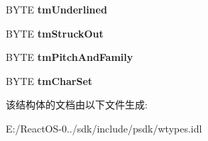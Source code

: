 \begin{DoxyCompactItemize}
B\+Y\+TE {\bfseries tm\+Underlined}
\item 
\mbox{\label{struct_i_win_types_1_1tag_t_e_x_t_m_e_t_r_i_c_a_ac6046de1eee37d3e350f988397a76fb9}} 
B\+Y\+TE {\bfseries tm\+Struck\+Out}
\item 
\mbox{\label{struct_i_win_types_1_1tag_t_e_x_t_m_e_t_r_i_c_a_a7fb69d622efd4197064c012ad96b3761}} 
B\+Y\+TE {\bfseries tm\+Pitch\+And\+Family}
\item 
\mbox{\label{struct_i_win_types_1_1tag_t_e_x_t_m_e_t_r_i_c_a_af76b8cb20ac116959aa181f499cebcc7}} 
B\+Y\+TE {\bfseries tm\+Char\+Set}
\end{DoxyCompactItemize}


该结构体的文档由以下文件生成\+:\begin{DoxyCompactItemize}
\item 
E\+:/\+React\+O\+S-\/0../sdk/include/psdk/wtypes.\+idl\end{DoxyCompactItemize}
